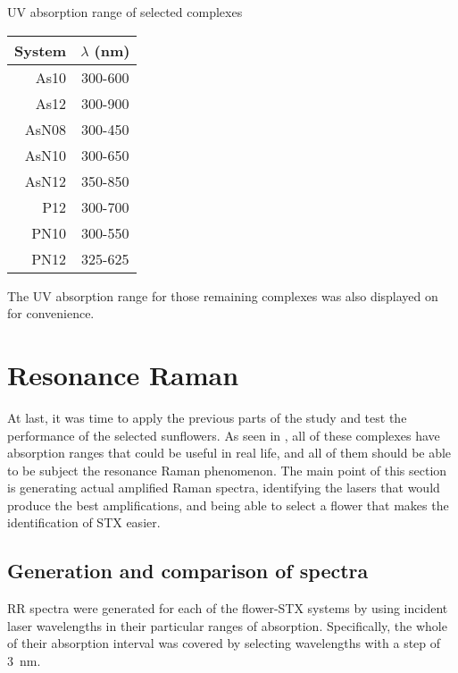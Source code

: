 \begin{margintable}
    \centering
    \caption[UV absorption range of selected complexes]{UV absorption range of selected complexes}
    \begin{tabular}{@{}rc@{}}
        \toprule
        System & $\lambda$ (\si{\nano\metre}) \\
        \midrule
        As10 & 300-600 \\
        As12 & 300-900 \\
        AsN08 & 300-450 \\
        AsN10 & 300-650 \\
        AsN12 & 350-850 \\
        P12 & 300-700 \\
        PN10 & 300-550 \\
        PN12 & 325-625 \\
    \end{tabular}
\end{margintable}

The UV absorption range for those remaining complexes was also displayed on  for convenience.

\section{Resonance Raman}
At last, it was time to apply the previous parts of the study and test the performance of the selected sunflowers.
As seen in , all of these complexes have absorption ranges that could be useful in real life, and all of them should be able to be subject the resonance Raman phenomenon.
The main point of this section is generating actual amplified Raman spectra, identifying the lasers that would produce the best amplifications, and being able to select a flower that makes the identification of STX easier.

\subsection{Generation and comparison of spectra}
RR spectra were generated for each of the flower-STX systems by using incident laser wavelengths in their particular ranges of absorption.
Specifically, the whole of their absorption interval was covered by selecting wavelengths with a step of \SI{3}{\nano\metre}.

